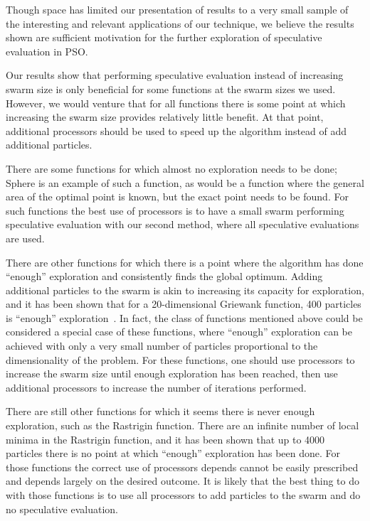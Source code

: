 \documentclass[conference,letterpaper]{IEEEtran}
\begin{document}
Though space has limited our presentation of results to a very small sample of
the interesting and relevant applications of our technique, we believe the
results shown are sufficient motivation for the further exploration of
speculative evaluation in PSO.

Our results show that performing speculative evaluation instead of increasing
swarm size is only beneficial for some functions at the swarm sizes we used.
However, we would venture that for all functions there is some point at which
increasing the swarm size provides relatively little benefit.  At that point,
additional processors should be used to speed up the algorithm instead of add
additional particles.

There are some functions for which almost no exploration needs to be done;
Sphere is an example of such a function, as would be a function where the
general area of the optimal point is known, but the exact point needs to be
found.  For such functions the best use of processors is to have a small swarm
performing speculative evaluation with our second method, where all speculative
evaluations are used.

There are other functions for which there is a point where the algorithm has
done ``enough'' exploration and consistently finds the global optimum.  Adding
additional particles to the swarm is akin to increasing its capacity for
exploration, and it has been shown that for a 20-dimensional Griewank function,
400 particles is ``enough'' exploration~\cite{mcnabb-cec09}.  In fact, the
class of functions mentioned above could be considered a special case of these
functions, where ``enough'' exploration can be achieved with only a very small
number of particles proportional to the dimensionality of the problem.  For
these functions, one should use processors to increase the swarm size until
enough exploration has been reached, then use additional processors to increase
the number of iterations performed.

There are still other functions for which it seems there is never enough
exploration, such as the Rastrigin function.  There are an infinite number of
local minima in the Rastrigin function, and it has been shown that up to 4000
particles there is no point at which ``enough'' exploration has been done.  For
those functions the correct use of processors depends cannot be easily
prescribed and depends largely on the desired outcome.  It is likely that the
best thing to do with those functions is to use all processors to add particles
to the swarm and do no speculative evaluation.
\end{document}
